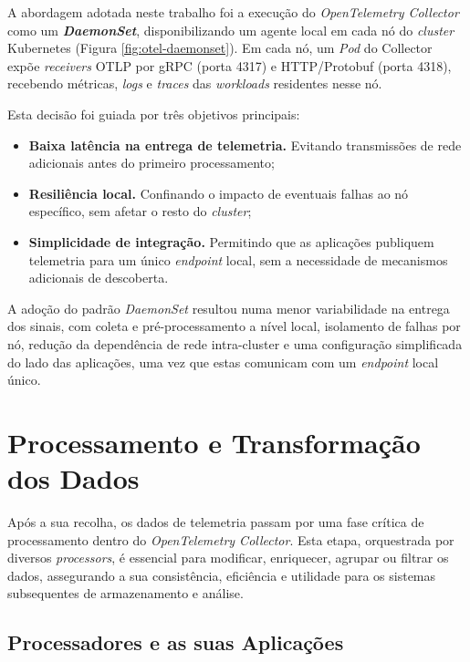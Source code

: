 A abordagem adotada neste trabalho foi a execução do \textit{OpenTelemetry Collector} como um \textbf{\textit{DaemonSet}}, disponibilizando um agente local em cada nó do \textit{cluster} Kubernetes (Figura \ref{fig:otel-daemonset}). Em cada nó, um \textit{Pod} do Collector expõe \textit{receivers} OTLP por gRPC (porta 4317) e HTTP/Protobuf (porta 4318), recebendo métricas, \textit{logs} e \textit{traces} das \textit{workloads} residentes nesse nó.

Esta decisão foi guiada por três objetivos principais:

\begin{itemize}
    \item \textbf{Baixa latência na entrega de telemetria.} Evitando transmissões de rede adicionais antes do primeiro processamento;
    \item \textbf{Resiliência local.} Confinando o impacto de eventuais falhas ao nó específico, sem afetar o resto do \textit{cluster};
    \item \textbf{Simplicidade de integração.} Permitindo que as aplicações publiquem telemetria para um único \textit{endpoint} local, sem a necessidade de mecanismos adicionais de descoberta.
\end{itemize}

A adoção do padrão \textit{DaemonSet} resultou numa menor variabilidade na entrega dos sinais, com coleta e pré-processamento a nível local, isolamento de falhas por nó, redução da dependência de rede intra-cluster e uma configuração simplificada do lado das aplicações, uma vez que estas comunicam com um \textit{endpoint} local único.


\section{Processamento e Transformação dos Dados}

Após a sua recolha, os dados de telemetria passam por uma fase crítica de processamento dentro do \textit{OpenTelemetry Collector}. Esta etapa, orquestrada por diversos \textit{processors}, é essencial para modificar, enriquecer, agrupar ou filtrar os dados, assegurando a sua consistência, eficiência e utilidade para os sistemas subsequentes de armazenamento e análise.


\subsection{Processadores e as suas Aplicações}

